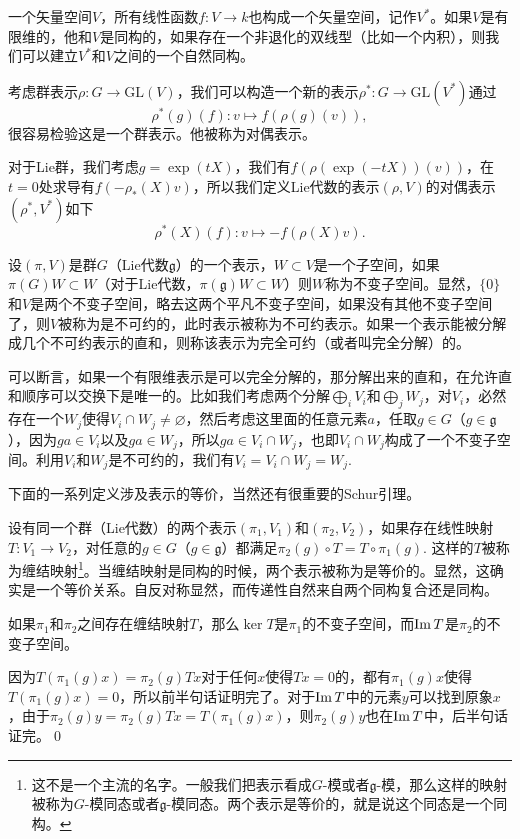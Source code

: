 \documentclass[9pt]{extarticle}
\newcommand{\lag}{{\mathfrak{g}}}
\begin{document}
\para 一个矢量空间$V$，所有线性函数$f:V\to k$也构成一个矢量空间，记作$V^*$。如果$V$是有限维的，他和$V$是同构的，如果存在一个非退化的双线型（比如一个内积），则我们可以建立$V^*$和$V$之间的一个自然同构。

考虑群表示$\rho:G\to \mathrm{GL}(V)$，我们可以构造一个新的表示$\rho^*:G\to \mathrm{GL}(V^*)$通过
\[
	\rho^*(g)(f):v\mapsto f(\rho(g)(v)),
\]
很容易检验这是一个群表示。他被称为对偶表示。

对于Lie群，我们考虑$g=\exp(tX)$，我们有$f(\rho(\exp(-tX))(v))$，在$t=0$处求导有$f(-\rho_*(X)v)$，所以我们定义Lie代数的表示$(\rho,V)$的对偶表示$(\rho^*,V^*)$如下
\[
	\rho^*(X)(f):v\mapsto -f(\rho(X)v).
\]

\para 设$(\pi,V)$是群$G$（Lie代数$\lag$）的一个表示，$W\subset V$是一个子空间，如果$\pi(G)W\subset W$（对于Lie代数，$\pi(\lag)W\subset W$）则$W$称为不变子空间。显然，$\{0\}$和$V$是两个不变子空间，略去这两个平凡不变子空间，如果没有其他不变子空间了，则$V$被称为是不可约的，此时表示被称为不可约表示。如果一个表示能被分解成几个不可约表示的直和，则称该表示为完全可约（或者叫完全分解）的。

\para 可以断言，如果一个有限维表示是可以完全分解的，那分解出来的直和，在允许直和顺序可以交换下是唯一的。比如我们考虑两个分解$\bigoplus_i V_i$和$\bigoplus_j W_j$，对$V_i$，必然存在一个$W_j$使得$V_i\cap W_j\neq \varnothing$，然后考虑这里面的任意元素$a$，任取$g\in G$（$g\in\lag$），因为$ga\in V_i$以及$ga\in W_j$，所以$ga\in V_i\cap W_j$，也即$V_i\cap W_j$构成了一个不变子空间。利用$V_i$和$W_j$是不可约的，我们有$V_i=V_i\cap W_j=W_j$.

下面的一系列定义涉及表示的等价，当然还有很重要的Schur引理。

\para 设有同一个群（Lie代数）的两个表示$(\pi_1,V_1)$和$(\pi_2,V_2)$，如果存在线性映射$T:V_1\to V_2$，对任意的$g\in G$（$g\in \lag$）都满足$\pi_2(g)\circ T=T\circ \pi_1(g)$. 这样的$T$被称为缠结映射\footnote{这不是一个主流的名字。一般我们把表示看成$G$-模或者$\lag$-模，那么这样的映射被称为$G$-模同态或者$\lag$-模同态。两个表示是等价的，就是说这个同态是一个同构。}。当缠结映射是同构的时候，两个表示被称为是等价的。显然，这确实是一个等价关系。自反对称显然，而传递性自然来自两个同构复合还是同构。

\lem 如果$\pi_1$和$\pi_2$之间存在缠结映射$T$，那么$\ker T$是$\pi_1$的不变子空间，而$\operatorname{Im} T$是$\pi_2$的不变子空间。

\proof 因为$T(\pi_1(g)x)=\pi_2(g)Tx$对于任何$x$使得$Tx=0$的，都有$\pi_1(g)x$使得$T(\pi_1(g)x)=0$，所以前半句话证明完了。对于$\operatorname{Im} T$中的元素$y$可以找到原象$x$，由于$\pi_2(g)y=\pi_2(g)Tx=T(\pi_1(g)x)$，则$\pi_2(g)y$也在$\operatorname{Im} T$中，后半句话证完。\qed
\end{document}
